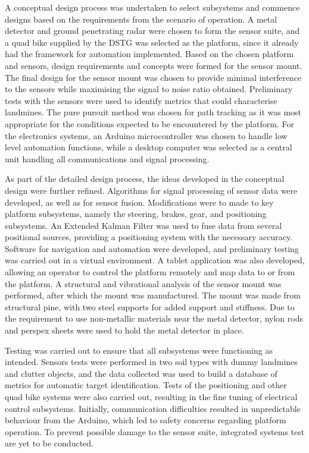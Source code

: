 \documentclass[main.tex]{subfiles}
\begin{document}
A conceptual design process was undertaken to select subsystems and commence designs based on the requirements from the scenario of operation. A metal detector and ground penetrating radar were chosen to form the sensor suite, and a quad bike supplied by the DSTG was selected as the platform, since it already had the framework for automation implemented. Based on the chosen platform and sensors, design requirements and concepts were formed for the sensor mount. The final design for the sensor mount was chosen to provide minimal interference to the sensors while maximising the signal to noise ratio obtained. Preliminary tests with the sensors were used to identify metrics that could characterise landmines. The pure pursuit method was chosen for path tracking as it was most appropriate for the conditions expected to be encountered by the platform. For the electronics systems, an Arduino microcontroller was chosen to handle low level automation functions, while a desktop computer was selected as a central unit handling all communications and signal processing. 

As part of the detailed design process, the ideas developed in the conceptual design were further refined. Algorithms for signal processing of sensor data were developed, as well as for sensor fusion. Modifications were to made to key platform subsystems, namely the steering, brakes, gear, and positioning subsystems. An Extended Kalman Filter was used to fuse data from several positional sources, providing a positioning system with the necessary accuracy. Software for navigation and automation were developed, and preliminary testing was carried out in a virtual environment. A tablet application was also developed, allowing an operator to control the platform remotely and map data to or from the platform. A structural and vibrational analysis of the sensor mount was performed, after which the mount was manufactured. The mount was made from structural pine, with two steel supports for added support and stiffness. Due to the requirement to use non-metallic materials near the metal detector, nylon rods and perspex sheets were used to hold the metal detector in place.    

Testing was carried out to ensure that all subsystems were functioning as intended. Sensors tests were performed in two soil types with dummy landmines and clutter objects, and the data collected was used to build a database of metrics for automatic target identification. Tests of the positioning and other quad bike systems were also carried out, resulting in the fine tuning of electrical control subsystems. Initially, communication difficulties resulted in unpredictable behaviour from the Arduino, which led to safety concerns regarding platform operation. To prevent possible damage to the sensor suite, integrated systems test are yet to be conducted. 
\end{document}
